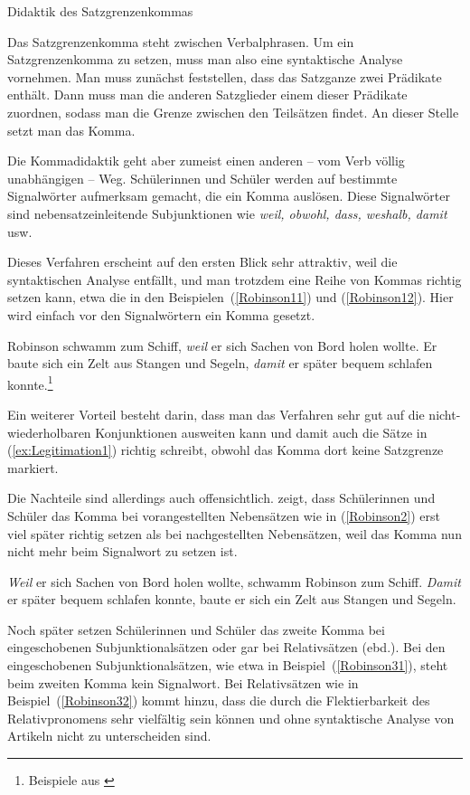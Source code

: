 \begin{Exkurs}{Didaktik des Satzgrenzenkommas}\label{Ex:Didaktik Satzgrenzenkomma}

Das Satzgrenzenkomma steht zwischen Verbalphrasen. Um ein Satzgrenzenkomma zu setzen, muss man also eine syntaktische Analyse vornehmen. Man muss zunächst feststellen, dass das Satzganze zwei Prädikate enthält. Dann muss man die anderen Satzglieder einem dieser Prädikate zuordnen, sodass man die Grenze zwischen den Teilsätzen findet. An dieser Stelle setzt man das Komma.

Die Kommadidaktik geht aber zumeist einen anderen -- vom Verb völlig unabhängigen -- Weg. Schülerinnen und Schüler werden auf bestimmte Signalwörter aufmerksam gemacht, die ein Komma auslösen. Diese Signalwörter sind nebensatzeinleitende Subjunktionen wie \textit{weil, obwohl, dass, weshalb, damit} usw.

Dieses Verfahren erscheint auf den ersten Blick sehr attraktiv, weil die syntaktischen Analyse entfällt, und man trotzdem eine Reihe von Kommas richtig setzen kann, etwa die in den Beispielen~(\ref{Robinson11}) und (\ref{Robinson12}). Hier wird einfach vor den Signalwörtern ein Komma gesetzt.

\ea \label{Robinson1}
\ea Robinson schwamm zum Schiff, \textit{weil} er sich Sachen von Bord holen wollte.\label{Robinson11}
\ex Er baute sich ein Zelt aus Stangen und Segeln, \textit{damit} er später bequem schlafen konnte.\label{Robinson12}\footnote{Beispiele aus \citet[72]{RobbenRusnok2011}}
\z
\z

Ein weiterer Vorteil besteht darin, dass man das Verfahren sehr gut auf die nicht-wiederholbaren Konjunktionen ausweiten kann und damit auch die Sätze in (\ref{ex:Legitimation1}) richtig schreibt, obwohl das Komma dort keine Satzgrenze markiert. 

Die Nachteile sind allerdings auch offensichtlich. \citet[106]{Afflerbach1997} zeigt, dass Schülerinnen und Schüler das Komma bei vorangestellten Nebensätzen wie in (\ref{Robinson2}) erst viel später richtig setzen als bei nachgestellten Nebensätzen, weil das Komma nun nicht mehr beim Signalwort zu setzen ist.

\ea \label{Robinson2}
\ea \textit{Weil} er sich Sachen von Bord holen wollte, schwamm Robinson zum Schiff.
\ex \textit{Damit} er später bequem schlafen konnte, baute er sich ein Zelt aus Stangen und Segeln.
\z
\z

\largerpage
Noch später setzen Schülerinnen und Schüler das zweite Komma bei eingeschobenen Subjunktionalsätzen oder gar bei Relativsätzen (ebd.). Bei den eingeschobenen Subjunktionalsätzen, wie etwa in Beispiel~(\ref{Robinson31}), steht beim zweiten Komma kein Signalwort. Bei Relativsätzen wie in Beispiel~(\ref{Robinson32}) kommt hinzu, dass die  durch die Flektierbarkeit des Relativpronomens sehr vielfältig sein können und ohne syntaktische Analyse von Artikeln nicht zu unterscheiden sind.


\end{Exkurs}
